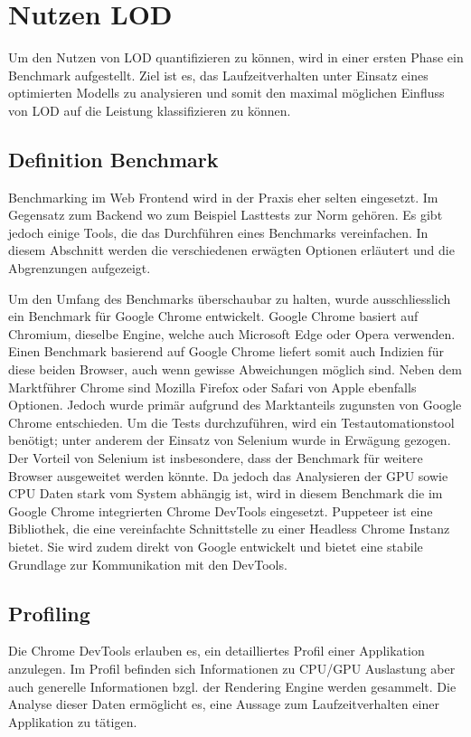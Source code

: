 \section{Nutzen LOD}
Um den Nutzen von LOD quantifizieren zu können, wird in einer ersten Phase ein Benchmark aufgestellt.
Ziel ist es, das Laufzeitverhalten unter Einsatz eines optimierten Modells zu analysieren und somit den maximal möglichen Einfluss von LOD auf die Leistung klassifizieren zu können.

\subsection{Definition Benchmark}
Benchmarking im Web Frontend wird in der Praxis eher selten eingesetzt. Im Gegensatz zum Backend wo zum Beispiel Lasttests zur Norm gehören.
Es gibt jedoch einige Tools, die das Durchführen eines Benchmarks vereinfachen. In diesem Abschnitt werden die verschiedenen erwägten Optionen erläutert und die Abgrenzungen aufgezeigt.

Um den Umfang des Benchmarks überschaubar zu halten, wurde ausschliesslich ein Benchmark für Google Chrome entwickelt.
Google Chrome basiert auf Chromium, dieselbe Engine, welche auch Microsoft Edge oder Opera verwenden.
Einen Benchmark basierend auf Google Chrome liefert somit auch Indizien für diese beiden Browser, auch wenn gewisse Abweichungen möglich sind.
Neben dem Marktführer Chrome sind Mozilla Firefox oder Safari von Apple ebenfalls Optionen. Jedoch wurde primär aufgrund des Marktanteils zugunsten von Google Chrome entschieden.
Um die Tests durchzuführen, wird ein Testautomationstool benötigt; unter anderem der Einsatz von Selenium wurde in Erwägung gezogen.
Der Vorteil von Selenium ist insbesondere, dass der Benchmark für weitere Browser ausgeweitet werden könnte.
Da jedoch das Analysieren der GPU sowie CPU Daten stark vom System abhängig ist, wird in diesem Benchmark die im Google Chrome integrierten Chrome DevTools eingesetzt.
Puppeteer ist eine Bibliothek, die eine vereinfachte Schnittstelle zu einer Headless Chrome Instanz bietet.
Sie wird zudem direkt von Google entwickelt und bietet eine stabile Grundlage zur Kommunikation mit den DevTools.

\subsection{Profiling}
Die Chrome DevTools erlauben es, ein detailliertes Profil einer Applikation anzulegen.
Im Profil befinden sich Informationen zu CPU/GPU Auslastung aber auch generelle Informationen bzgl. der Rendering Engine werden gesammelt.
Die Analyse dieser Daten ermöglicht es, eine Aussage zum Laufzeitverhalten einer Applikation zu tätigen.

